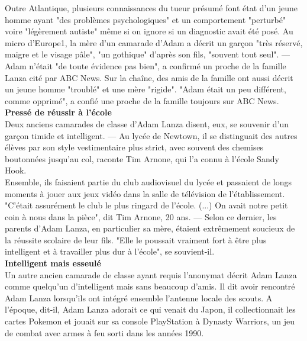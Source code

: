 \documentclass[11pt,twoside,a4paper]{article}
\begin{document}
	Outre Atlantique, plusieurs connaissances du tueur pr{\'e}sum{\'e} font {\'e}tat d'un jeune homme ayant "des probl{\`e}mes psychologiques" et un comportement "perturb{\'e}" voire "l{\'e}g{\`e}rement autiste" m{\^e}me si on ignore si un diagnostic avait {\'e}t{\'e} pos{\'e}. Au micro d'Europe1, la m{\`e}re d'un camarade d'Adam a d{\'e}crit un gar\c{c}on "tr{\`e}s r{\'e}serv{\'e}, maigre et le visage p{\^a}le", "un gothique" d'apr{\`e}s son fils, "souvent tout seul". --- Adam n'{\'e}tait "de toute {\'e}vidence pas bien", a confirm{\'e} un proche de la famille Lanza cit{\'e} par ABC News. Sur la cha{\^i}ne, des amis de la famille ont aussi d{\'e}crit un jeune homme "troubl{\'e}" et une m{\`e}re "rigide". "Adam {\'e}tait un peu diff{\'e}rent, comme opprim{\'e}", a confi{\'e} une proche de la famille toujours sur ABC News. ~\\
	
	\textbf{Press{\'e} de r{\'e}ussir {\`a} l'{\'e}cole}~\\
	
	Deux anciens camarades de classe d'Adam Lanza disent, eux, se souvenir d'un gar\c{c}on timide et intelligent. --- Au lyc{\'e}e de Newtown, il se distinguait des autres {\'e}l{\`e}ves par son style vestimentaire plus strict, avec souvent des chemises boutonn{\'e}es jusqu'au col, raconte Tim Arnone, qui l'a connu {\`a} l'{\'e}cole Sandy Hook. ~\\
	
	Ensemble, ils faisaient partie du club audiovisuel du lyc{\'e}e et passaient de longs moments {\`a} jouer aux jeux vid{\'e}o dans la salle de t{\'e}l{\'e}vision de l'{\'e}tablissement. "C'{\'e}tait assur{\'e}ment le club le plus ringard de l'{\'e}cole. (...) On avait notre petit coin {\`a} nous dans la pi{\`e}ce", dit Tim Arnone, 20 ans. --- Selon ce dernier, les parents d'Adam Lanza, en particulier sa m{\`e}re, {\'e}taient extr{\^e}mement soucieux de la r{\'e}ussite scolaire de leur fils. "Elle le poussait vraiment fort {\`a} {\^e}tre plus intelligent et {\`a} travailler plus dur {\`a} l'{\'e}cole", se souvient-il. ~\\
	
	\textbf{Intelligent mais esseul{\'e}}~\\
	
	Un autre ancien camarade de classe ayant requis l'anonymat d{\'e}crit Adam Lanza comme quelqu'un d'intelligent mais sans beaucoup d'amis. Il dit avoir rencontr{\'e} Adam Lanza lorsqu'ils ont int{\'e}gr{\'e} ensemble l'antenne locale des scouts. A l'{\'e}poque, dit-il, Adam Lanza adorait ce qui venait du Japon, il collectionnait les cartes Pokemon et jouait sur sa console PlayStation {\`a} Dynasty Warriors, un jeu de combat avec armes {\`a} feu sorti dans les ann{\'e}es 1990. ~\\
	
\end{document}
